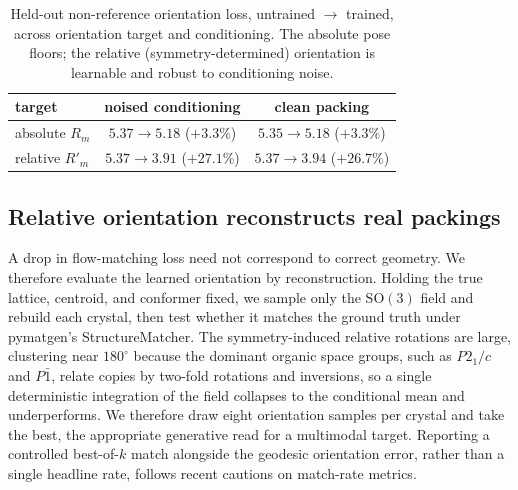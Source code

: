 \documentclass[11pt]{article}
\begin{document}
\begin{table}[t]
\centering
\caption{Held-out non-reference orientation loss, untrained $\rightarrow$
trained, across orientation target and conditioning. The absolute pose floors;
the relative (symmetry-determined) orientation is learnable and robust to
conditioning noise.}
\label{tab:twobytwo}
\begin{tabular}{lcc}
\toprule
target & noised conditioning & clean packing \\
\midrule
absolute $R_m$  & $5.37\!\rightarrow\!5.18$ ($+3.3\%$) & $5.35\!\rightarrow\!5.18$ ($+3.3\%$) \\
relative $R'_m$ & $5.37\!\rightarrow\!3.91$ ($+27.1\%$) & $5.37\!\rightarrow\!3.94$ ($+26.7\%$) \\
\bottomrule
\end{tabular}
\end{table}

\subsection{Relative orientation reconstructs real packings}

A drop in flow-matching loss need not correspond to correct geometry. We
therefore evaluate the learned orientation by reconstruction. Holding the true
lattice, centroid, and conformer fixed, we sample only the $\mathrm{SO}(3)$ field
and rebuild each crystal, then test whether it matches the ground truth under
pymatgen's StructureMatcher\cite{ong2013pymatgen}. The symmetry-induced relative
rotations are large, clustering near $180^\circ$ because the dominant organic
space groups, such as $P2_1/c$ and $P\bar{1}$, relate copies by two-fold
rotations and inversions\cite{groom2016csd}, so a single deterministic
integration of the field collapses to the conditional mean and underperforms. We
therefore draw eight orientation samples per crystal and take the best, the
appropriate generative read for a multimodal target. Reporting a
controlled best-of-$k$ match alongside the geodesic orientation error, rather
than a single headline rate, follows recent cautions on match-rate
metrics\cite{martirossyan2025matching}.
\end{document}
